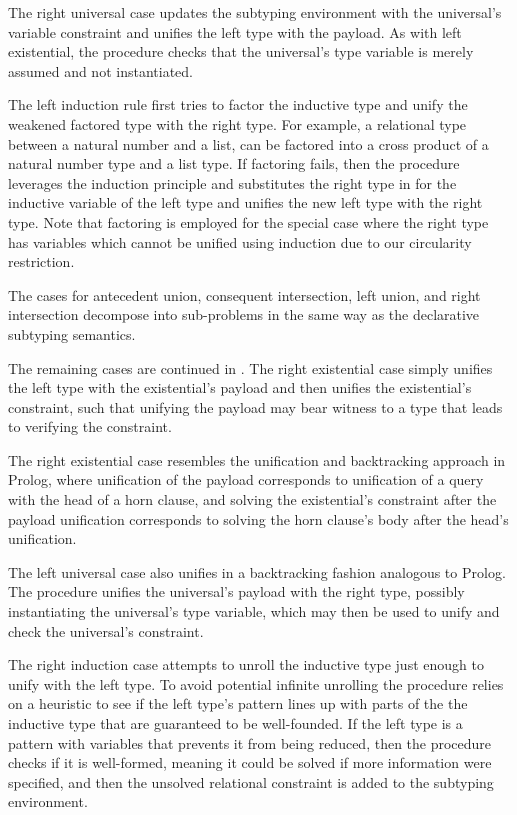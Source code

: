 \documentclass[acmsmall]{acmart}
\begin{document}
The right universal case updates the subtyping environment with the universal's variable constraint
and unifies the left type with the payload. As with left existential, the procedure checks that
the universal's type variable is merely assumed and not instantiated.

The left induction rule first tries to factor the inductive type and unify the weakened factored type
with the right type. For example, a relational type between a natural number and a list, can be factored into
a cross product of a natural number type and a list type. 
If factoring fails, then the procedure leverages the induction principle and substitutes the right type 
in for the inductive variable of the left type and unifies the new left type with the right type.    
Note that factoring is employed for the special
case where the right type has variables which cannot be unified 
using induction due to our circularity restriction.  

The cases for antecedent union, consequent intersection, left union, and right intersection
decompose into sub-problems in the same way as the declarative subtyping semantics.

The remaining cases are continued in .
The right existential case simply unifies the left type with the existential's payload
and then unifies the existential's constraint, such that unifying the payload
may bear witness to a type that leads to verifying the constraint. 


The right existential case resembles the unification and backtracking approach in Prolog, 
where unification of the payload corresponds to unification of a query with the head of a horn clause,
and solving the existential's constraint after the payload unification corresponds to
solving the horn clause's body after the head's unification.  

The left universal case also unifies in a backtracking fashion analogous to Prolog.
The procedure unifies the universal's payload with the right type,
possibly instantiating the universal's type variable,
which may then be used to unify and check the universal's constraint.

The right induction case attempts to unroll the inductive type just enough
to unify with the left type. To avoid potential infinite unrolling
the procedure relies on a heuristic to see if the left type's pattern
lines up with parts of the the inductive type that are guaranteed to be well-founded. 
If the left type is a pattern with variables that prevents it from being reduced,
then the procedure checks if it is well-formed, meaning it could be solved 
if more information were specified, and then the unsolved relational constraint
is added to the subtyping environment. 
\end{document}
